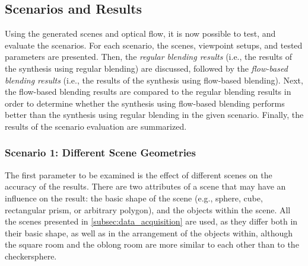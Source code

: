 \subsection{Scenarios and Results}\label{subsec:virt_results}
Using the generated scenes and optical flow, it is now possible to test, and evaluate the scenarios. 
For each scenario, the scenes, viewpoint setups, and tested parameters are presented. Then, the \emph{regular blending results} (i.e., the results of the synthesis using regular blending) are discussed, followed by the \emph{flow-based blending results} (i.e., the results of the synthesis using flow-based blending). Next, the flow-based blending results are compared to the regular blending results in order to determine whether the synthesis using flow-based blending performs better than the synthesis using regular blending in the given scenario. Finally, the results of the scenario evaluation are summarized.

\subsubsection{Scenario 1: Different Scene Geometries}
The first parameter to be examined is the effect of different scenes on the accuracy of the results. There are two attributes of a scene that may have an influence on the result: the basic shape of the scene (e.g., sphere, cube, rectangular prism, or arbitrary polygon), and the objects within the scene. All the scenes presented in \ref{subsec:data_acquisition} are used, as they differ both in their basic shape, as well as in the arrangement of the objects within, although the square room and the oblong room are more similar to each other than to the checkersphere.

